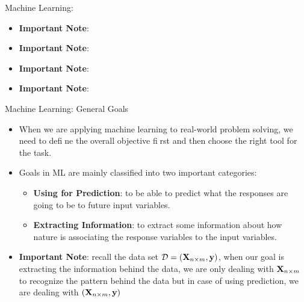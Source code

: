 \documentclass[compress,oilve]{beamer}
\begin{document}



\begin{frame}{Machine Learning: }
\begin{itemize}
\item \textbf{Important Note}: 
\item \textbf{Important Note}:
\item \textbf{Important Note}:  
\item \textbf{Important Note}: 
\end{itemize}
\end{frame}


\begin{frame}{Machine Learning: General Goals}
\begin{itemize}
\item When we are applying machine learning to real-world
problem solving, we need to define the overall objective first and then choose the right tool
for the task.
\item Goals in ML are mainly classified into two important categories:
\begin{itemize}
\item \textbf{Using for Prediction}: to be able to predict what the responses are going to be to future input variables.
\item \textbf{Extracting Information}: to extract some information about how nature is associating the response variables to the input variables.
\end{itemize}
\item \textbf{Important Note}: recall the data set $ \mathcal{D} = (\mathbf{X_{\mathnormal n \times \mathnormal m}} , \mathbf{y}) $, when our goal is extracting the information behind the data, we are only dealing with $ \mathbf{X_{\mathnormal n \times \mathnormal m}} $ to recognize the pattern behind the data but in case of using prediction, we are dealing with $ (\mathbf{X_{\mathnormal n \times \mathnormal m}} , \mathbf{y}) $
\end{itemize}
\end{frame}
\end{document}
